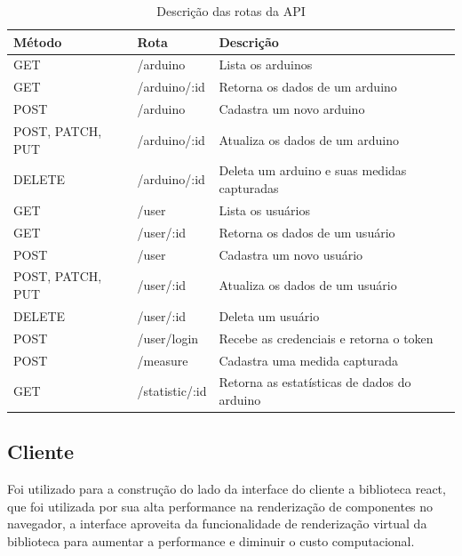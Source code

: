 \begin{table}[H]
    \centering
    \caption{Descrição das rotas da API}
    \label{table_api_routes}
    \begin{tabular}{|l|l|l|}
    \hline
    \textbf{Método}  & \textbf{Rota}        & \textbf{Descrição}                           \\ \hline
    GET              & /arduino             & Lista os arduinos                            \\ \hline
    GET              & /arduino/:id         & Retorna os dados de um arduino               \\ \hline
    POST             & /arduino             & Cadastra um novo arduino                     \\ \hline
    POST, PATCH, PUT & /arduino/:id         & Atualiza os dados de um arduino              \\ \hline
    DELETE           & /arduino/:id         & Deleta um arduino e suas medidas capturadas  \\ \hline
    GET              & /user                & Lista os usuários                            \\ \hline
    GET              & /user/:id            & Retorna os dados de um usuário               \\ \hline
    POST             & /user                & Cadastra um novo usuário                     \\ \hline
    POST, PATCH, PUT & /user/:id            & Atualiza os dados de um usuário              \\ \hline
    DELETE           & /user/:id            & Deleta um usuário                            \\ \hline
    POST             & /user/login          & Recebe as credenciais e retorna o token      \\ \hline
    POST             & /measure             & Cadastra uma medida capturada                \\ \hline
    GET              & /statistic/:id       & Retorna as estatísticas de dados do arduino  \\ \hline
    \end{tabular}
\end{table}

\subsection{Cliente}

Foi utilizado para a construção do lado da interface do cliente a biblioteca react, que foi utilizada por sua alta performance na renderização de componentes no navegador, a interface aproveita da funcionalidade de renderização virtual da biblioteca para aumentar a performance e diminuir o custo computacional.

